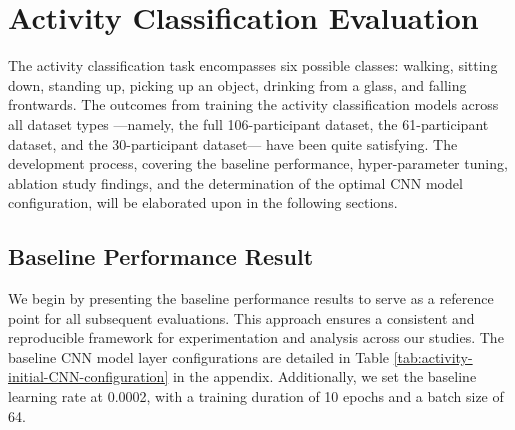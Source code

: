 \documentclass{l4proj}
\begin{document}
\section{Activity Classification Evaluation}
The activity classification task encompasses six possible classes: walking, sitting down, standing up, picking up an object, drinking from a glass, and falling frontwards. The outcomes from training the activity classification models across all dataset types —namely, the full 106-participant dataset, the 61-participant dataset, and the 30-participant dataset— have been quite satisfying. The development process, covering the baseline performance, hyper-parameter tuning, ablation study findings, and the determination of the optimal CNN model configuration, will be elaborated upon in the following sections.

\subsection{Baseline Performance Result} \label{activity_baseline_performance_result}
We begin by presenting the baseline performance results to serve as a reference point for all subsequent evaluations. This approach ensures a consistent and reproducible framework for experimentation and analysis across our studies. The baseline CNN model layer configurations are detailed in Table \ref{tab:activity-initial-CNN-configuration} in the appendix. Additionally, we set the baseline learning rate at 0.0002, with a training duration of 10 epochs and a batch size of 64.
\end{document}
